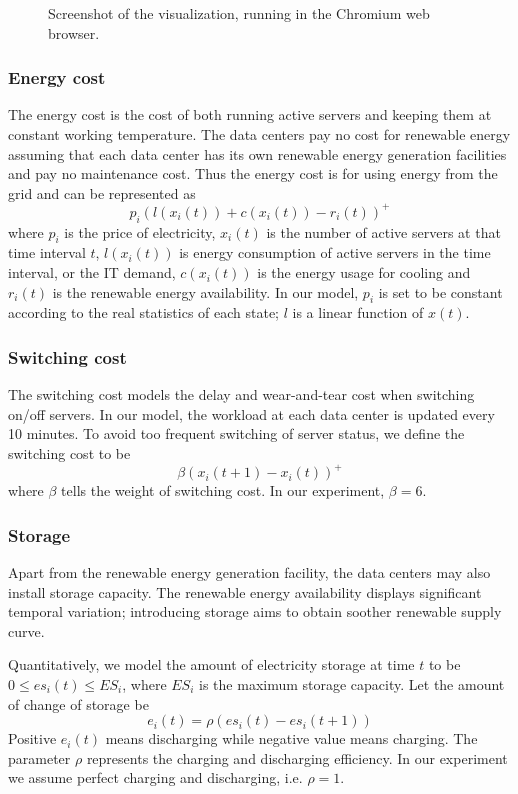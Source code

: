\documentclass{acm_proc_article-sp}
\begin{document}
\begin{figure*}
\centering
{}
\caption{Screenshot of the visualization, running in the Chromium web browser.}
\end{figure*}
\subsubsection{Energy cost}
The energy cost is the cost of both running active servers and keeping them at constant working temperature. The data centers pay no cost for renewable energy assuming that each data center has its own renewable energy generation facilities and pay no maintenance cost. Thus the energy cost is for using energy from the grid and can be represented as
\begin{equation}
p_i(l(x_i(t)) + c(x_i(t)) - r_i(t))^+
\end{equation}  
where $p_i$ is the price of electricity, $x_i(t)$ is the number of active servers at that time interval $t$, $l(x_i(t))$ is energy consumption of active servers in the time interval, or the IT demand, $c(x_i(t))$ is the energy usage for cooling and $r_i(t)$ is the renewable energy availability. In our model, $p_i$ is set to be constant according to the real statistics of each state; $l$ is a linear function of $x(t)$.

\subsubsection{Switching cost}
The switching cost models the delay and wear-and-tear cost when switching on/off servers. In our model, the workload at each data center is updated every 10 minutes. To avoid too frequent switching of server status, we define the switching cost to be
$$\beta(x_i(t+1) - x_i(t))^+$$
where $\beta$ tells the weight of switching cost. In our experiment, $\beta = 6$.

\subsubsection{Storage}
Apart from the renewable energy generation facility, the data centers may also install storage capacity. The renewable energy availability displays significant temporal variation; introducing storage aims to obtain soother renewable supply curve.

Quantitatively, we model the amount of electricity storage at time $t$ to be $0 \leq es_i(t) \leq ES_i$, where $ES_i$ is the maximum storage capacity. Let the amount of change of storage be 
$$e_i(t) = \rho (es_i(t) - es_i(t+1))$$
Positive $e_i(t)$ means discharging while negative value means charging. The parameter $\rho$ represents the charging and discharging efficiency. In our experiment we assume perfect charging and discharging, i.e. $\rho = 1$.
\end{document}
